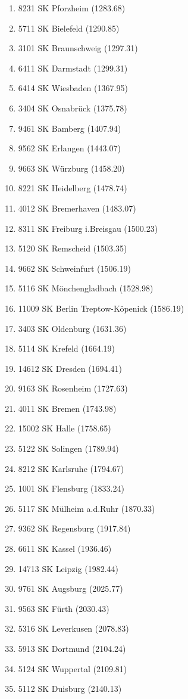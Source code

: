 \begin{enumerate}[itemsep=-6mm]
\item 8231 SK Pforzheim (1283.68)
\item 5711 SK Bielefeld (1290.85)
\item 3101 SK Braunschweig (1297.31)
\item 6411 SK Darmstadt (1299.31)
\item 6414 SK Wiesbaden (1367.95)
\item 3404 SK Osnabrück (1375.78)
\item 9461 SK Bamberg (1407.94)
\item 9562 SK Erlangen (1443.07)
\item 9663 SK Würzburg (1458.20)
\item 8221 SK Heidelberg (1478.74)
\item 4012 SK Bremerhaven (1483.07)
\item 8311 SK Freiburg i.Breisgau (1500.23)
\item 5120 SK Remscheid (1503.35)
\item 9662 SK Schweinfurt (1506.19)
\item 5116 SK Mönchengladbach (1528.98)
\item 11009 SK Berlin Treptow-Köpenick (1586.19)
\item 3403 SK Oldenburg (1631.36)
\item 5114 SK Krefeld (1664.19)
\item 14612 SK Dresden (1694.41)
\item 9163 SK Rosenheim (1727.63)
\item 4011 SK Bremen (1743.98)
\item 15002 SK Halle (1758.65)
\item 5122 SK Solingen (1789.94)
\item 8212 SK Karlsruhe (1794.67)
\item 1001 SK Flensburg (1833.24)
\item 5117 SK Mülheim a.d.Ruhr (1870.33)
\item 9362 SK Regensburg (1917.84)
\item 6611 SK Kassel (1936.46)
\item 14713 SK Leipzig (1982.44)
\item 9761 SK Augsburg (2025.77)
\item 9563 SK Fürth (2030.43)
\item 5316 SK Leverkusen (2078.83)
\item 5913 SK Dortmund (2104.24)
\item 5124 SK Wuppertal (2109.81)
\item 5112 SK Duisburg (2140.13)

\end{enumerate}

